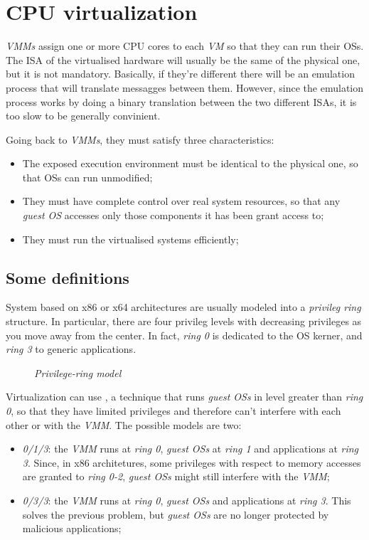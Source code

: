 \section{CPU virtualization}
\emph{VMMs} assign one or more CPU cores to each \emph{VM} so that they can run
their OSs. The ISA of the virtualised hardware will usually be the same
of the physical one, but it is not mandatory. Basically, if they're different
there will be an emulation process that will translate messagges between them.
However, since the emulation process works by doing a binary translation between
the two different ISAs, it is too slow to be generally convinient.

Going back to \emph{VMMs}, they must satisfy three characteristics:
\begin{itemize}
    \item The exposed execution environment  must be identical to the
    physical one, so that OSs can run unmodified;
    \item They must have complete control over real system resources, so that
    any \emph{guest OS} accesses only those components it has been grant access
    to;
    \item They must run the virtualised systems efficiently;
\end{itemize}

\subsection{Some definitions}
System based on x86 or x64 architectures are usually modeled into a \emph{privileg
ring} structure. In particular, there are four privileg levels with decreasing
privileges as you move away from the center. In fact, \emph{ring 0} is dedicated
to the OS kerner, and \emph{ring 3} to generic applications.

\begin{figure}[h!]
    \centering
    \caption{\emph{Privilege-ring model}}
\end{figure}

\noindent
Virtualization can use , a technique that runs
\emph{guest OSs} in level greater than \emph{ring 0}, so that they have
limited privileges and therefore can't interfere with each other or with the
\emph{VMM}. The possible models are two:
\begin{itemize}
    \item\emph{0/1/3}: the \emph{VMM} runs at \emph{ring 0}, \emph{guest OSs}
    at \emph{ring 1} and applications at \emph{ring 3}. Since, in x86 architetures,
    some privileges with respect to memory accesses are granted to \emph{ring 0-2},
    \emph{guest OSs} might still interfere with the \emph{VMM};
    \item\emph{0/3/3}: the \emph{VMM} runs at \emph{ring 0}, \emph{guest OSs}
    and applications at \emph{ring 3}. This solves the previous problem, but
    \emph{guest OSs} are no longer protected by malicious applications;
\end{itemize}

